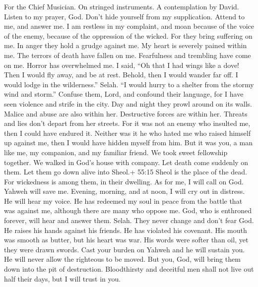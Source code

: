 For the Chief Musician. On stringed instruments. A contemplation by
David.  Listen to my prayer, God. Don't hide yourself from
my supplication.  Attend to me, and answer me. I am restless
in my complaint, and moan  because of the voice of the
enemy, because of the oppression of the wicked. For they bring suffering
on me. In anger they hold a grudge against me.  My heart is
severely pained within me. The terrors of death have fallen on me.
 Fearfulness and trembling have come on me. Horror has
overwhelmed me.  I said, ``Oh that I had wings like a dove!
Then I would fly away, and be at rest.  Behold, then I would
wander far off. I would lodge in the wilderness.'' Selah. 
``I would hurry to a shelter from the stormy wind and storm.''
 Confuse them, Lord, and confound their language, for I have
seen violence and strife in the city.  Day and night they
prowl around on its walls. Malice and abuse are also within her.
 Destructive forces are within her. Threats and lies don't
depart from her streets.  For it was not an enemy who
insulted me, then I could have endured it. Neither was it he who hated
me who raised himself up against me, then I would have hidden myself
from him.  But it was you, a man like me, my companion, and
my familiar friend.  We took sweet fellowship together. We
walked in God's house with company.  Let death come
suddenly on them. Let them go down alive into Sheol.+ 55:15 Sheol is the
place of the dead. For wickedness is among them, in their dwelling.
 As for me, I will call on God. Yahweh will save me.
 Evening, morning, and at noon, I will cry out in distress.
He will hear my voice.  He has redeemed my soul in peace
from the battle that was against me, although there are many who oppose
me.  God, who is enthroned forever, will hear and answer
them. Selah. They never change and don't fear God.  He
raises his hands against his friends. He has violated his covenant.
 His mouth was smooth as butter, but his heart was war. His
words were softer than oil, yet they were drawn swords. 
Cast your burden on Yahweh and he will sustain you. He will never allow
the righteous to be moved.  But you, God, will bring them
down into the pit of destruction. Bloodthirsty and deceitful men shall
not live out half their days, but I will trust in you.

